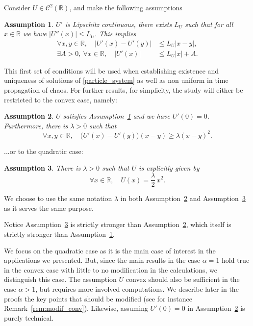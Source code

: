 \documentclass[JEP,XML,SOM,Unicode,published]{cedram}
\theoremstyle{plain}
\newtheorem{assumption}{Assumption}
\theoremstyle{definition}
\begin{document}
Consider $U\in\mathcal{C}^2(\mathbb{R})$, and make the following assumptions
\begin{assumption}\label{Hyp_U_lip}
$U'$ is Lipschitz continuous, \ie there exists $L_U$ such that for all $x\in\mathbb{R}$ we have $\left|U''(x)\right|\leq L_U$. This implies\vspace*{-3pt}
\begin{align*}
\forall x,y\in\mathbb{R},\quad \left|U'(x)-U'(y)\right|&\leq L_U|x-y|,
\\
\tag*{and}
\exists A>0,\ \forall x\in\mathbb{R},\quad \left|U'(x)\right|&\leq L_U| x|+A.
\end{align*}
\end{assumption}
This first set of conditions will be used when establishing existence and uniqueness of solutions of \eqref{particle_system} as well as non uniform in time propagation of chaos. For further results, for simplicity, the study will either be restricted to the convex case, namely:

\begin{assumption}\label{Hyp_U_conv}$U$ satisfies Assumption~\ref{Hyp_U_lip} and we have $U'(0)=0$. Furthermore,
there is $\lambda>0$ such that\vspace*{-3pt}
\[
\forall x,y\in\mathbb{R},\quad \bigl(U'(x)-U'(y)\bigr)(x-y)\geq \lambda(x-y)^2.
\]
\end{assumption}
\noindent
...or to the quadratic case:
\begin{assumption}\label{Hyp_U_quad}
There is $\lambda>0$ such that $U$ is explicitly given by\vspace*{-3pt}
\[
\forall x\in\mathbb{R},\quad U(x)=\frac{\lambda}{2}\,x^2.
\]
\end{assumption}
We choose to use the same notation $\lambda$ in both Assumption~\ref{Hyp_U_conv} and Assumption~\ref{Hyp_U_quad} as it serves the same purpose.

Notice Assumption~\ref{Hyp_U_quad} is strictly stronger than Assumption~\ref{Hyp_U_conv}, which itself is strictly stronger than Assumption~\ref{Hyp_U_lip}.

We focus on the quadratic case as it is the main case of interest in the applications we presented. But, since the main results in the case $\alpha=1$ hold true in the convex case with little to no modification in the calculations, we distinguish this case. The assumption $U$ convex should also be sufficient in the case $\alpha>1$, but requires more involved computations. We describe later in the proofs the key points that should be modified (see for instance Remark~\ref{rem:modif_conv}). Likewise, assuming $U'(0)=0$ in Assumption~\ref{Hyp_U_conv} is purely technical.
\end{document}
